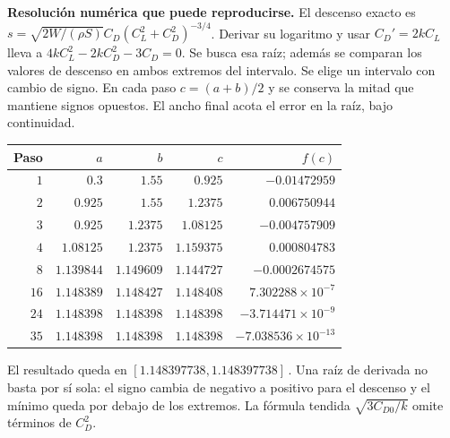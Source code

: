 \textbf{Resolución numérica que puede reproducirse.} El descenso exacto es $s=\sqrt{2W/(\rho S)}C_D(C_L^2+C_D^2)^{-3/4}$. Derivar su logaritmo y usar $C_D\prime=2kC_L$ lleva a $4kC_L^2-2kC_D^2-3C_D=0$. Se busca esa raíz; además se comparan los valores de descenso en ambos extremos del intervalo. Se elige un intervalo con cambio de signo. En cada paso $c=(a+b)/2$ y se conserva la mitad que mantiene signos opuestos. El ancho final acota el error en la raíz, bajo continuidad.
\begin{center}\begin{tabular}{rrrrr}
\toprule Paso & $a$ & $b$ & $c$ & $f(c)$\\\midrule
$1$ & $0.3$ & $1.55$ & $0.925$ & $-0.01472959$\\
$2$ & $0.925$ & $1.55$ & $1.2375$ & $0.006750944$\\
$3$ & $0.925$ & $1.2375$ & $1.08125$ & $-0.004757909$\\
$4$ & $1.08125$ & $1.2375$ & $1.159375$ & $0.000804783$\\
$8$ & $1.139844$ & $1.149609$ & $1.144727$ & $-0.0002674575$\\
$16$ & $1.148389$ & $1.148427$ & $1.148408$ & $7.302288\times10^{-7}$\\
$24$ & $1.148398$ & $1.148398$ & $1.148398$ & $-3.714471\times10^{-9}$\\
$35$ & $1.148398$ & $1.148398$ & $1.148398$ & $-7.038536\times10^{-13}$\\
\bottomrule\end{tabular}\end{center}
El resultado queda en $[1.148397738,1.148397738]\,$. Una raíz de derivada no basta por sí sola: el signo cambia de negativo a positivo para el descenso y el mínimo queda por debajo de los extremos. La fórmula tendida $\sqrt{3C_{D0}/k}$ omite términos de $C_D^2$.
